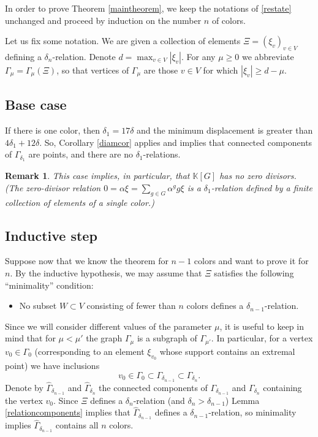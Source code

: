 \documentclass[11pt,letterpaper]{amsart}
\newtheorem*{remark}{Remark}
\begin{document}
In order to prove Theorem \ref{maintheorem}, we keep the notations of \ref{restate} unchanged and proceed by induction on the number $n$ of colors. %

Let us fix some notation. We are given a collection of elements $\Xi=(\xi_v)_{v\in V}$ defining a $\delta_n$-relation. Denote $d=\max_{v\in V}|\xi_v|$. For any $\mu\geq 0$ we abbreviate $\Gamma_{\mu}=\Gamma_{\mu}(\Xi)$, so that vertices of $\Gamma_{\mu}$ are those $v\in V$ for which $|\xi_v|\geq d-\mu$. 
\subsection*{Base case}
If there is one color, then $\delta_1=17\delta$ and the minimum displacement is greater than $4\delta_1+12\delta$. So, Corollary \ref{diamcor} applies and implies that connected components of $\Gamma_{\delta_1}$ are points, and there are no $\delta_1$-relations. 
\begin{remark}
This case implies, in particular, that $\mathbb K[G]$ has no zero divisors. (The zero-divisor relation $0=\alpha\xi=\sum_{g\in G}\alpha^gg\xi$ is a $\delta_1$-relation defined by a finite collection of elements of a single color.)
\end{remark}
\subsection*{Inductive step}
Suppose now that we know the theorem for $n-1$ colors and want to prove it for $n$. By the inductive hypothesis, we may assume that $\Xi$  satisfies the following ``minimality'' condition:
\begin{itemize}
\item
No subset $W\subset V$ consisting of fewer than $n$ colors defines a $\delta_{n-1}$-relation. 
\end{itemize}
Since we will consider different values of the parameter $\mu$, it is useful to keep in mind that for $\mu<\mu'$ the graph $\Gamma_{\mu}$ is a subgraph of $\Gamma_{\mu'}$. In particular, for a vertex $v_0\in\Gamma_0$ (corresponding to an element $\xi_{v_0}$ whose support contains an extremal point) we have inclusions 
$$
v_0\in\Gamma_0\subset\Gamma_{\delta_{n-1}}\subset\Gamma_{\delta_n}. 
$$  
Denote by $\hat\Gamma_{\delta_{n-1}}$ and $\hat\Gamma_{\delta_n}$ the connected components of $\Gamma_{\delta_{n-1}}$ and $\Gamma_{\delta_n}$ containing the vertex $v_0$. Since $\Xi$ defines a $\delta_n$-relation (and $\delta_n>\delta_{n-1}$) Lemma \ref{relationcomponents} implies that $\hat{\Gamma}_{\delta_{n-1}}$ defines a $\delta_{n-1}$-relation, so minimality implies $\hat\Gamma_{\delta_{n-1}}$ contains all $n$ colors. 
\end{document}
